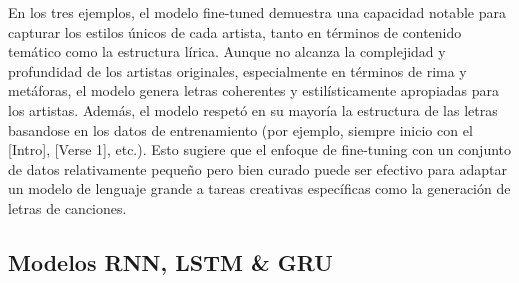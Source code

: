 \documentclass[paper=letter, fontsize=11pt, draft=false]{scrartcl}
\numberwithin{equation}{section} %
\numberwithin{figure}{section} %
\numberwithin{table}{section} %
\numberwithin{subsection}{section}
\begin{document}
En los tres ejemplos, el modelo fine-tuned demuestra una capacidad notable para capturar los estilos únicos de cada artista, tanto en términos de contenido temático como la estructura lírica. Aunque no alcanza la complejidad y profundidad de los artistas originales, especialmente en términos de rima y metáforas, el modelo genera letras coherentes y estilísticamente apropiadas para los artistas. Además, el modelo respetó en su mayoría la estructura de las letras basandose en los datos de entrenamiento (por ejemplo, siempre inicio con el [Intro], [Verse 1], etc.). Esto sugiere que el enfoque de fine-tuning con un conjunto de datos relativamente pequeño pero bien curado puede ser efectivo para adaptar un modelo de lenguaje grande a tareas creativas específicas como la generación de letras de canciones.

\subsection{Modelos RNN, LSTM \& GRU}



\newpage
\end{document}
